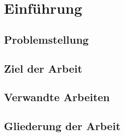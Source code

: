 \chapter{Einführung}
\section{Problemstellung}
\section{Ziel der Arbeit}
\section{Verwandte Arbeiten}
\section{Gliederung der Arbeit}


